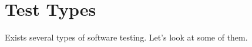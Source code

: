 \section{Test Types}
\label{sec:testing-types}

Exists several types of software testing. Let's look at some of them.



